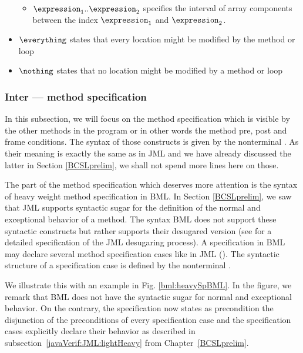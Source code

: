 \begin{itemize}
\begin{itemize}
                  \item $ \expression_1 .. \expression_2$ specifies the interval of array components between the index $\expression_1$  and $\expression_2$.  
                         
            \end{itemize}

      \item $\everything $ states that every location might be modified by the method or loop
      \item $\nothing$ states that no location might be modified by a method or loop
\end{itemize}


\subsubsection{Inter --- method specification}

 In this subsection, we will focus on the method specification which is visible by the other methods in the program
 or in other words the method pre, post and frame conditions. 
 The syntax of those constructs is given by the nonterminal
 \MethodSpec. As their meaning is exactly the same as in JML and we have already discussed the latter
  in Section \ref{BCSLprelim}, we shall not spend more lines here on those.

 The part of the method specification which deserves more attention 
 is the syntax of heavy weight method specification in BML. 
 In Section \ref{BCSLprelim}, we saw that JML supports syntactic sugar for
 the definition of the normal and exceptional behavior of a method. 
 The syntax BML does not
 support these syntactic constructs but rather supports their desugared version
 (see \cite{RT03djml} for a detailed specification of the JML desugaring process).
 A specification in BML may declare several method specification cases like in JML (\specCases).
 The syntactic structure of a specification case is defined by the nonterminal \specCase.



 We illustrate this with an example in Fig. \ref{bml:heavySpBML}.
 In the figure, we remark that BML does not have the syntactic sugar for normal and exceptional behavior.
 On the contrary, the specification now states 
as precondition the disjunction of the preconditions of every specification case and 
the specification cases explicitly declare their behavior as described in subsection~\ref{javaVerif:JML:lightHeavy} from Chapter~\ref{BCSLprelim}.

